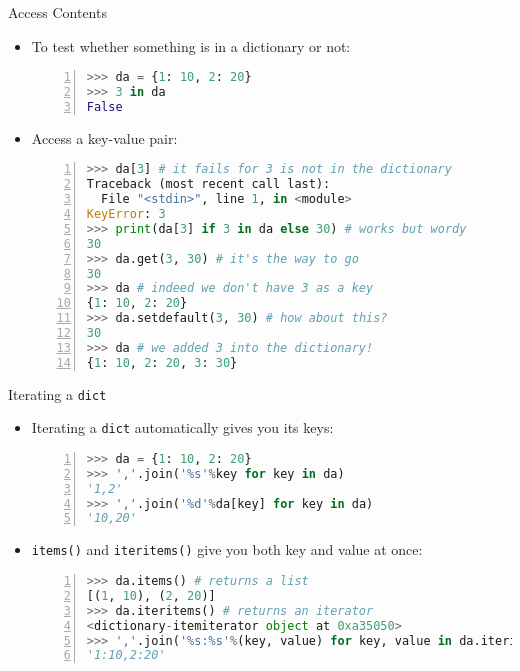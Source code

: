 \documentclass[dvips,xcolor=pst,14pt]{beamer}
\begin{document}
\begin{frame}[fragile]{
%
Access Contents
%
}
\begin{itemize}
\item To test whether something is in a dictionary or not:
  \begin{lstlisting}[basicstyle=\scriptsize\ttfamily,numbers=left,language=Python]
>>> da = {1: 10, 2: 20}
>>> 3 in da
False
  \end{lstlisting}
\item Access a key-value pair:
  \begin{lstlisting}[basicstyle=\scriptsize\ttfamily,numbers=left,language=Python]
>>> da[3] # it fails for 3 is not in the dictionary
Traceback (most recent call last):
  File "<stdin>", line 1, in <module>
KeyError: 3
>>> print(da[3] if 3 in da else 30) # works but wordy
30
>>> da.get(3, 30) # it's the way to go
30
>>> da # indeed we don't have 3 as a key
{1: 10, 2: 20}
>>> da.setdefault(3, 30) # how about this?
30
>>> da # we added 3 into the dictionary!
{1: 10, 2: 20, 3: 30}
  \end{lstlisting}
\end{itemize}
\end{frame}

\begin{frame}[fragile]{
%
Iterating a \texttt{dict}
%
}
\begin{itemize}
\item Iterating a \texttt{dict} automatically gives you its keys:
  \begin{lstlisting}[basicstyle=\scriptsize\ttfamily,numbers=left,language=Python]
>>> da = {1: 10, 2: 20}
>>> ','.join('%s'%key for key in da)
'1,2'
>>> ','.join('%d'%da[key] for key in da)
'10,20'
  \end{lstlisting}
\item \texttt{items()} and \texttt{iteritems()} give you both key and value at
once:
  \begin{lstlisting}[basicstyle=\scriptsize\ttfamily,numbers=left,language=Python]
>>> da.items() # returns a list
[(1, 10), (2, 20)]
>>> da.iteritems() # returns an iterator
<dictionary-itemiterator object at 0xa35050>
>>> ','.join('%s:%s'%(key, value) for key, value in da.iteritems())
'1:10,2:20'
  \end{lstlisting}
\end{itemize}
\end{frame}
\end{document}
